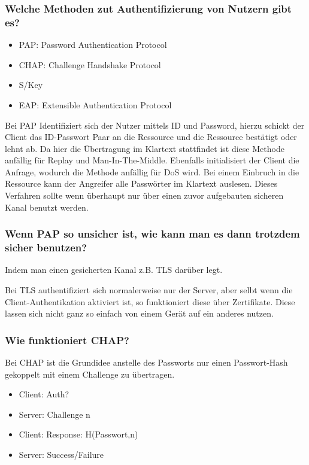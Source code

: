 	\subsubsection{Welche Methoden zut Authentifizierung von Nutzern gibt es?}
	\begin{itemize}
		\item PAP: Password Authentication Protocol
		\item CHAP: Challenge Handshake Protocol
		\item S/Key 
		\item EAP: Extensible Authentication Protocol
	\end{itemize}
	
	Bei PAP Identifiziert sich der Nutzer mittels ID und Password, hierzu schickt der Client das ID-Passwort Paar an die Ressource und die Ressource bestätigt oder lehnt ab. Da hier die Übertragung im Klartext stattfindet ist diese Methode anfällig für Replay und Man-In-The-Middle. Ebenfalls initialisiert der Client die Anfrage, wodurch die Methode anfällig für DoS wird. Bei einem Einbruch in die Ressource kann der Angreifer alle Passwörter im Klartext auslesen. Dieses Verfahren sollte wenn überhaupt nur über einen zuvor aufgebauten sicheren Kanal benutzt werden. 
	
		\subsubsection{Wenn PAP so unsicher ist, wie kann man es dann trotzdem sicher benutzen?}
	Indem man einen gesicherten Kanal z.B. TLS darüber legt.
	
	Bei TLS authentifiziert sich normalerweise nur der Server, aber selbt wenn die Client-Authentikation aktiviert ist, so funktioniert diese über Zertifikate. Diese lassen sich nicht ganz so einfach von einem Gerät auf ein anderes nutzen.
	
	\subsubsection{Wie funktioniert CHAP?}
	Bei CHAP ist die Grundidee anstelle des Passworts  nur einen Passwort-Hash gekoppelt mit einem Challenge zu übertragen.
	\begin{itemize}
		\item Client: Auth?
		\item Server: Challenge n
		\item Client: Response: H(Passwort,n)
		\item Server: Success/Failure
	\end{itemize}
	
